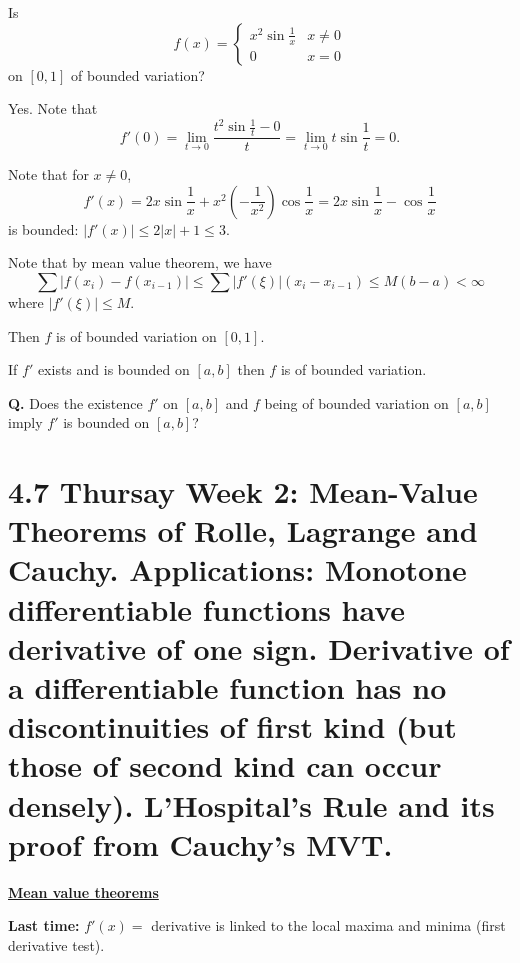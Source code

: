 \documentclass{notes}
\begin{document}
  \begin{eg}
    Is 
    \[
      f(x) = \begin{cases}
        x^2 \sin \frac{1}{x} & x \neq 0 \\ 
        0 & x = 0
      \end{cases}
    \]
    on $[0, 1]$ of bounded variation?
    
    Yes.
    Note that 
    \[
      f'(0) = \lim_{t \to 0} \frac{t^2 \sin \frac{1}{t} - 0}{t} = \lim_{t \to 0} t \sin \frac{1}{t} = 0.
    \]
    
    Note that for $x \neq 0$, 
    \[
      f'(x) = 2 x \sin \frac{1}{x} + x^2 \left ( -\frac{1}{x^2} \right ) \cos \frac{1}{x} = 2 x \sin \frac{1}{x} - \cos \frac{1}{x}
    \]
    is bounded: $\left | f'(x) \right | \leq 2 \left | x \right | + 1 \leq 3$.

    Note that by mean value theorem, we have 
    \[
      \sum \left | f(x_i) - f(x_{i - 1}) \right | \leq \sum \left | f'(\xi) \right | (x_i - x_{i - 1}) \leq M (b - a) < \infty
    \]
    where $\left | f'(\xi) \right | \leq M$.

    Then $f$ is of bounded variation on $[0, 1]$.
  \end{eg}
  
  \begin{thm}
    If $f'$ exists and is bounded on $[a, b]$ then $f$ is of bounded variation.
  \end{thm}
  
  {\boldmath \bfseries Q.} Does the existence $f'$ on $[a, b]$ and $f$ being of bounded variation on $[a, b]$ imply $f'$ is bounded on $[a, b]$?
  
  \section{4.7 Thursay Week 2: Mean-Value Theorems of Rolle, Lagrange and Cauchy. Applications: Monotone differentiable functions have \texorpdfstring{\newline}{}derivative of one sign. Derivative of a differentiable function has no discontinuities of first kind (but those of second kind can occur densely). L'Hospital's Rule and its proof from Cauchy's MVT.}

  {\boldmath \bfseries \underline{Mean value theorems}}

  {\boldmath \bfseries Last time:} $f'(x) = $ derivative is linked to the local maxima and minima (first derivative test).
\end{document}
